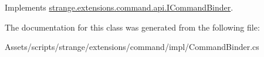 Implements \hyperlink{interfacestrange_1_1extensions_1_1command_1_1api_1_1_i_command_binder_ae063357e7694fe0e107a53cc77e8e112}{strange.\-extensions.\-command.\-api.\-I\-Command\-Binder}.



The documentation for this class was generated from the following file\-:\begin{DoxyCompactItemize}
\item 
Assets/scripts/strange/extensions/command/impl/Command\-Binder.\-cs\end{DoxyCompactItemize}
